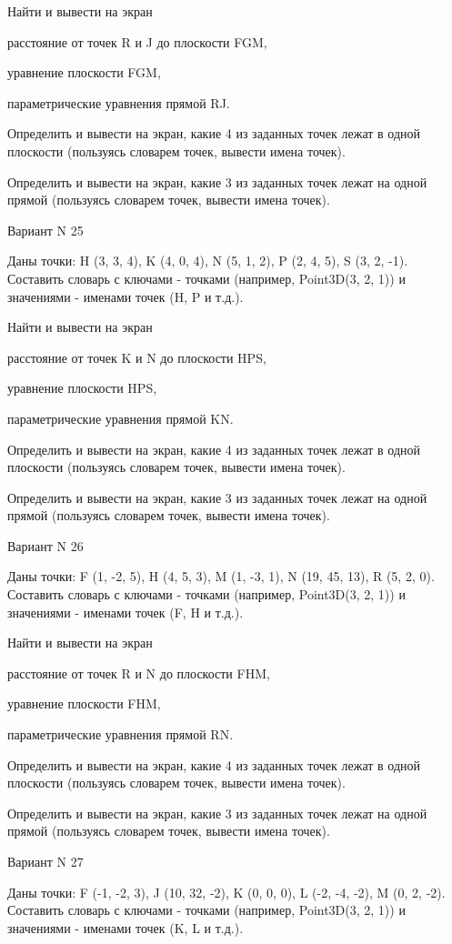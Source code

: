 \documentclass[11pt]{report}
\begin{document}
 
Найти и вывести на экран


расстояние от точек R и J до плоскости FGM,

 
уравнение плоскости FGM,

 
параметрические уравнения прямой RJ.


Определить и вывести на экран, какие 4 из заданных точек лежат в одной плоскости (пользуясь словарем точек, вывести имена точек).


Определить и вывести на экран, какие 3 из заданных точек лежат на одной прямой (пользуясь словарем точек, вывести имена точек).

Вариант N 25

Даны точки: H (3, 3, 4), K (4, 0, 4), N (5, 1, 2), P (2, 4, 5), S (3, 2, -1).
Составить словарь с ключами - точками (например, Point3D(3, 2, 1)) и значениями - именами точек (H, P и т.д.).

 
Найти и вывести на экран


расстояние от точек K и N до плоскости HPS,

 
уравнение плоскости HPS,

 
параметрические уравнения прямой KN.


Определить и вывести на экран, какие 4 из заданных точек лежат в одной плоскости (пользуясь словарем точек, вывести имена точек).


Определить и вывести на экран, какие 3 из заданных точек лежат на одной прямой (пользуясь словарем точек, вывести имена точек).

Вариант N 26

Даны точки: F (1, -2, 5), H (4, 5, 3), M (1, -3, 1), N (19, 45, 13), R (5, 2, 0).
Составить словарь с ключами - точками (например, Point3D(3, 2, 1)) и значениями - именами точек (F, H и т.д.).

 
Найти и вывести на экран


расстояние от точек R и N до плоскости FHM,

 
уравнение плоскости FHM,

 
параметрические уравнения прямой RN.


Определить и вывести на экран, какие 4 из заданных точек лежат в одной плоскости (пользуясь словарем точек, вывести имена точек).


Определить и вывести на экран, какие 3 из заданных точек лежат на одной прямой (пользуясь словарем точек, вывести имена точек).

Вариант N 27

Даны точки: F (-1, -2, 3), J (10, 32, -2), K (0, 0, 0), L (-2, -4, -2), M (0, 2, -2).
Составить словарь с ключами - точками (например, Point3D(3, 2, 1)) и значениями - именами точек (K, L и т.д.).
\end{document}

